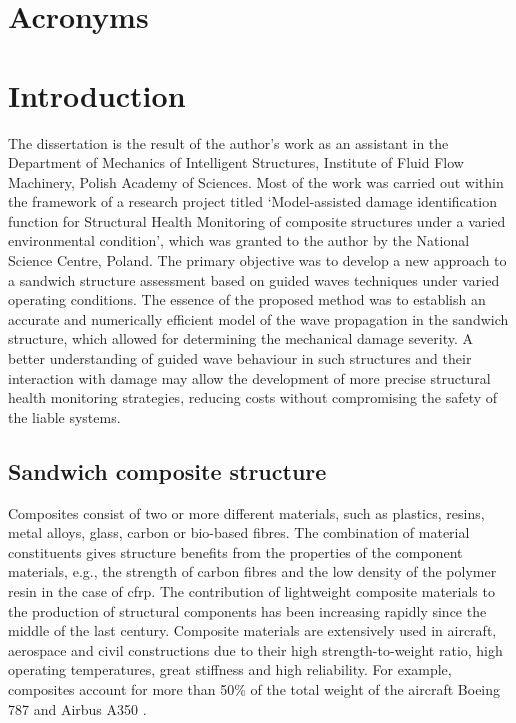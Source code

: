 \documentclass[11pt,a4paper,final]{report}
\theoremstyle{plain}
\begin{document}
\printnomenclature[6em]
\clearpage{}
\clearpage{}

\chapter*{Acronyms}
\label{acronyms}
\printacronyms[heading=none,pages={display=first}]\clearpage{}
\clearpage{}



\chapter[Introduction]{Introduction}
\label{ch:intro}
The dissertation is the result of the author’s work as an assistant in the Department of Mechanics of Intelligent Structures, Institute of Fluid Flow Machinery, Polish Academy of Sciences.
Most of the work was carried out within the framework of a research project titled ‘Model-assisted damage identification function for Structural Health Monitoring of composite structures under a varied environmental condition', which was granted to the author by the National Science Centre, Poland.
The primary objective was to develop a new approach to a sandwich structure assessment based on guided waves techniques under varied operating conditions.
The essence of the proposed method was to establish an accurate and numerically efficient model of the wave propagation in the sandwich structure, which allowed for determining the mechanical damage severity.
A better understanding of guided wave behaviour in such structures and their interaction with damage may allow the development of more precise structural health monitoring strategies, reducing costs without compromising the safety of the liable systems.


\section{Sandwich composite structure}
\label{sec:scs}

Composites consist of two or more different materials, such as plastics, resins, metal alloys, glass, carbon or bio-based fibres. The combination of material constituents gives  structure benefits from the properties of the component materials, e.g., the strength of carbon fibres and the low density of the polymer resin in the case of \ac{cfrp}.
The contribution of lightweight composite materials to the production of structural components has been increasing rapidly since the middle of the last century.
Composite materials are extensively used in aircraft, aerospace and civil constructions due to their high strength-to-weight ratio, high operating temperatures, great stiffness and high reliability.
For example, composites account for more than 50\% of the total weight of the aircraft Boeing 787 and Airbus A350 \cite{giurgiutiu2015structural}.
\end{document}
